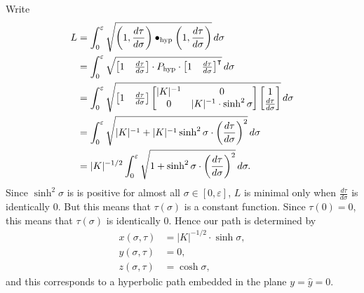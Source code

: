 \documentclass{ximera}
\begin{document}
\begin{problem}
  \begin{freeResponse}
    Write
    \begin{align*}
    L  &=\int_{0}^{\varepsilon} \sqrt{\left(1,\dd[\tau]{\sigma}\right)\bullet_\mathrm{hyp} \left(1,\dd[\tau]{\sigma}\right)}\d\sigma\\
    &= \int_{0}^{\varepsilon} \sqrt{
      \begin{bmatrix} 1 & \dd[\tau]{\sigma}
      \end{bmatrix} \cdot P_\mathrm{hyp}\cdot
      \begin{bmatrix} 1 & \dd[\tau]{\sigma}
      \end{bmatrix}^\transpose}\d\sigma \\
    &= \int_{0}^{\varepsilon} \sqrt{
      \begin{bmatrix} 1 & \dd[\tau]{\sigma}
      \end{bmatrix}
      \begin{bmatrix}
        |K|^{-1} & 0 \\
        0 & |K|^{-1}\cdot\sinh^2 \sigma
      \end{bmatrix}
      \begin{bmatrix} 1 \\ \dd[\tau]{\sigma}
    \end{bmatrix}}\d\sigma \\
    &= \int_{0}^{\varepsilon} \sqrt{
      |K|^{-1}+|K|^{-1}\sinh^{2}\sigma\cdot \left(\frac{d\tau }{d\sigma}\right)^{2}
    }\d\sigma \\
    &= |K|^{-1/2}\int_{0}^{\varepsilon} \sqrt{
      1+\sinh^{2}\sigma\cdot \left(\frac{d\tau }{d\sigma}\right)^{2}
    }\d\sigma.
    \end{align*}
   Since $\sinh^{2}\sigma$ is is positive for almost all $\sigma\in[
     0,\varepsilon] $, $L$ is minimal only when
   $\frac{d\tau}{d\sigma}$ is identically $0$. But this means that
   $\tau\left( \sigma\right) $ is a constant function. Since
   $\tau\left( 0\right) =0$, this means that $\tau\left( \sigma\right)
   $ is identically $0$. Hence our path is determined by
   \begin{align*}
     x(\sigma,\tau) &=|K|^{-1/2}\cdot \sinh\sigma,\\
     y(\sigma,\tau) &=0,\\
     z(\sigma,\tau) &=\cosh \sigma,
   \end{align*}
   and this corresponds to a hyperbolic path embedded in the plane
   $y=\hat{y}=0$.
  \end{freeResponse}

\end{problem}
\end{document}
